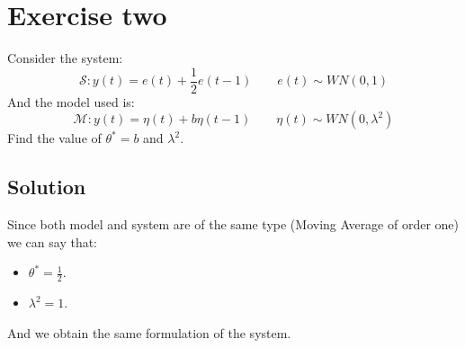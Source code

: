\section{Exercise two}

Consider the system: 
\[\mathcal{S}:y(t)=e(t)+\dfrac{1}{2}e(t-1)\qquad e(t)\sim WN(0,1)\]
And the model used is: 
\[\mathcal{M}:y(t)=\eta(t)+b\eta(t-1)\qquad \eta(t)\sim WN(0,\lambda^2)\]
Find the value of $\theta^\ast=b$ and $\lambda^2$. 

\subsection{Solution}
Since both model and system are of the same type (Moving Average of order one) we can say that: 
\begin{itemize}
    \item $\theta^\ast=\frac{1}{2}$. 
    \item $\lambda^2=1$. 
\end{itemize}
And we obtain the same formulation of the system. 